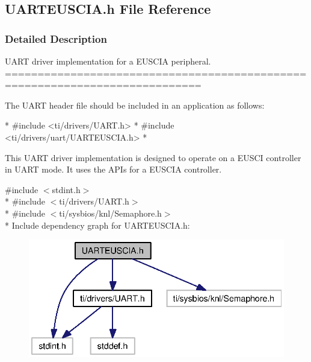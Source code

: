 \subsection{U\-A\-R\-T\-E\-U\-S\-C\-I\-A.\-h File Reference}
\label{_u_a_r_t_e_u_s_c_i_a_8h}


\subsubsection{Detailed Description}
U\-A\-R\-T driver implementation for a E\-U\-S\-C\-I\-A peripheral. ============================================================================

The U\-A\-R\-T header file should be included in an application as follows\-: 
\begin{DoxyCode}
*  #include <ti/drivers/UART.h>
*  #include <ti/drivers/uart/UARTEUSCIA.h>
*  
\end{DoxyCode}


This U\-A\-R\-T driver implementation is designed to operate on a E\-U\-S\-C\-I controller in U\-A\-R\-T mode. It uses the A\-P\-Is for a E\-U\-S\-C\-I\-A controller. 

{\ttfamily \#include $<$stdint.\-h$>$}\\*
{\ttfamily \#include $<$ti/drivers/\-U\-A\-R\-T.\-h$>$}\\*
{\ttfamily \#include $<$ti/sysbios/knl/\-Semaphore.\-h$>$}\\*
Include dependency graph for U\-A\-R\-T\-E\-U\-S\-C\-I\-A.\-h\-:
\nopagebreak
\begin{figure}[H]
\begin{center}
\leavevmode
\includegraphics[width=330pt]{_u_a_r_t_e_u_s_c_i_a_8h__incl}
\end{center}
\end{figure}
